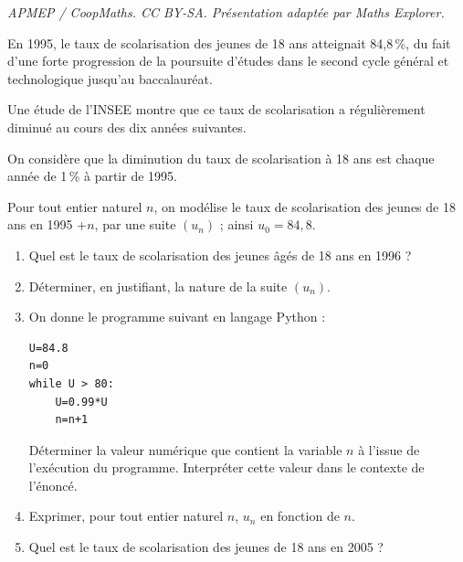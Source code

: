 \documentclass[10pt]{article}
\begin{document}
\noindent\textit{APMEP / CoopMaths. CC BY-SA. Présentation adaptée par Maths Explorer.}\par\medskip
\medskip

En 1995, le taux de scolarisation des jeunes de 18 ans atteignait 84,8\,\%, du fait d'une forte
progression de la poursuite d'études dans le second cycle général et technologique jusqu'au
baccalauréat.

Une étude de l'INSEE montre que ce taux de scolarisation a régulièrement diminué au cours
des dix années suivantes.

On considère que la diminution du taux de scolarisation à 18 ans est chaque année de 1\,\% à
partir de 1995.

Pour tout entier naturel $n$, on modélise le taux de scolarisation des jeunes de 18 ans en
1995 +$ n$, par une suite $\left(u_n\right)$ ; ainsi $u_0 = 84,8$.

\medskip

\begin{enumerate}
\item Quel est le taux de scolarisation des jeunes âgés de 18 ans en 1996 ?
\item Déterminer, en justifiant, la nature de la suite $\left(u_n\right)$.
\item On donne le programme suivant en langage Python :
\begin{lstlisting}[style=python]
U=84.8
n=0
while U > 80:
	U=0.99*U
	n=n+1
\end{lstlisting}

Déterminer la valeur numérique que contient la variable $n$ à l'issue de l'exécution du
programme. Interpréter cette valeur dans le contexte de l'énoncé.
\item Exprimer, pour tout entier naturel $n$, $u_n$ en fonction de $n$.
\item Quel est le taux de scolarisation des jeunes de 18 ans en 2005 ?
\end{enumerate}

\vspace{0,5cm}
\end{document}
